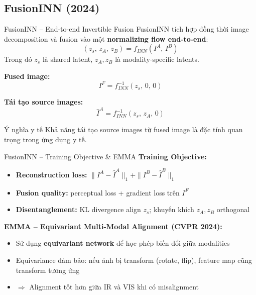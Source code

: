 \documentclass{beamer}
\begin{document}
\subsection{FusionINN (2024)}

\begin{frame}{FusionINN -- End-to-end Invertible Fusion}
    FusionINN tích hợp đồng thời image decomposition và fusion vào một \textbf{normalizing flow end-to-end}:
    \begin{equation}
        (z_s,\, z_A,\, z_B) = f_{INN}(I^A,\, I^B)
    \end{equation}
    Trong đó $z_s$ là shared latent, $z_A, z_B$ là modality-specific latents.

    \vspace{0.2cm}
    \textbf{Fused image:}
    \begin{equation}
        I^F = f_{INN}^{-1}(z_s,\, 0,\, 0)
    \end{equation}

    \textbf{Tái tạo source images:}
    \begin{equation}
        \hat{I}^A = f_{INN}^{-1}(z_s,\, z_A,\, 0)
    \end{equation}

    \vspace{0.2cm}
    \begin{exampleblock}{Ý nghĩa y tế}
        Khả năng tái tạo source images từ fused image là đặc tính quan trọng trong ứng dụng y tế.
    \end{exampleblock}
\end{frame}

\begin{frame}{FusionINN -- Training Objective \& EMMA}
    \textbf{Training Objective:}
    \begin{itemize}
        \item \textbf{Reconstruction loss:} $\|I^A - \hat{I}^A\|_1 + \|I^B - \hat{I}^B\|_1$
        \item \textbf{Fusion quality:} perceptual loss + gradient loss trên $I^F$
        \item \textbf{Disentanglement:} KL divergence align $z_s$; khuyến khích $z_A, z_B$ orthogonal
    \end{itemize}

    \vspace{0.3cm}
    \textbf{EMMA -- Equivariant Multi-Modal Alignment (CVPR 2024):}
    \begin{itemize}
        \item Sử dụng \textbf{equivariant network} để học phép biến đổi giữa modalities
        \item Equivariance đảm bảo: nếu ảnh bị transform (rotate, flip), feature map cũng transform tương ứng
        \item $\Rightarrow$ Alignment tốt hơn giữa IR và VIS khi có misalignment
    \end{itemize}
\end{frame}
\end{document}
